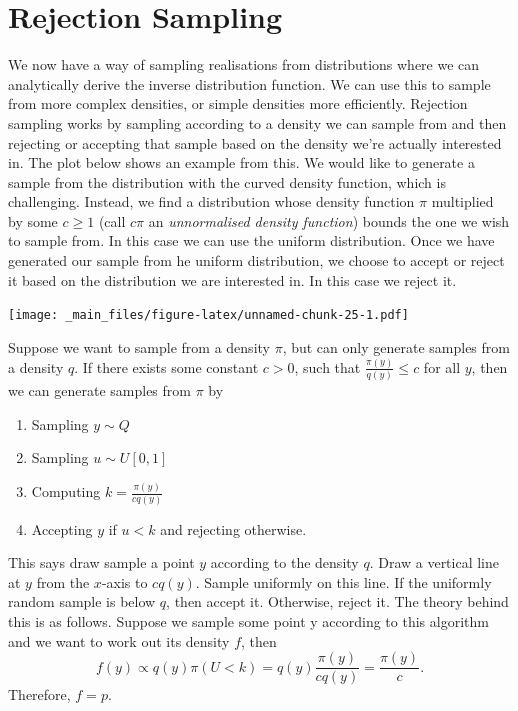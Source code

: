 \documentclass[
]{book}
\theoremstyle{definition}
\theoremstyle{definition}
\theoremstyle{definition}
\theoremstyle{definition}
\theoremstyle{remark}
\begin{document}
\hypertarget{rejection-sampling}{%
\section{Rejection Sampling}\label{rejection-sampling}}

We now have a way of sampling realisations from distributions where we can analytically derive the inverse distribution function. We can use this to sample from more complex densities, or simple densities more efficiently. Rejection sampling works by sampling according to a density we can sample from and then rejecting or accepting that sample based on the density we're actually interested in. The plot below shows an example from this. We would like to generate a sample from the distribution with the curved density function, which is challenging. Instead, we find a distribution whose density function \(\pi\) multiplied by some \(c \geq 1\) (call \(c\pi\) an \emph{unnormalised density function}) bounds the one we wish to sample from. In this case we can use the uniform distribution. Once we have generated our sample from he uniform distribution, we choose to accept or reject it based on the distribution we are interested in. In this case we reject it.

\texttt{[image: \_main\_files/figure-latex/unnamed-chunk-25-1.pdf]}

Suppose we want to sample from a density \(\pi\), but can only generate samples from a density \(q\). If there exists some constant \(c > 0\), such that \(\frac{\pi(y)}{q(y)} \leq c\) for all \(y\), then we can generate samples from \(\pi\) by

\begin{enumerate}
\def\labelenumi{\arabic{enumi}.}
\item
  Sampling \(y \sim Q\)
\item
  Sampling \(u \sim U[0, 1]\)
\item
  Computing \(k = \frac{\pi(y)}{cq(y)}\)
\item
  Accepting \(y\) if \(u < k\) and rejecting otherwise.
\end{enumerate}

This says draw sample a point \(y\) according to the density \(q\). Draw a vertical line at \(y\) from the \(x\)-axis to \(cq(y)\). Sample uniformly on this line. If the uniformly random sample is below \(q\), then accept it. Otherwise, reject it. The theory behind this is as follows. Suppose we sample some point y according to this algorithm and we want to work out its density \(f\), then
\[
f(y) \propto q(y)\pi(U < k) = q(y)\frac{\pi(y)}{cq(y)} = \frac{\pi(y)}{c}.
\]
Therefore, \(f = p\).
\end{document}

